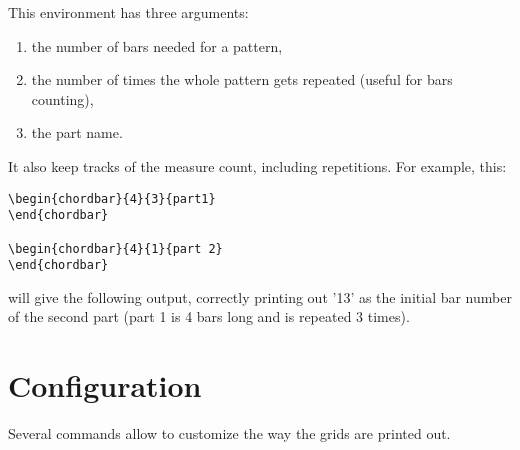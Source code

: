 \documentclass[11pt]{article}
\begin{document}
This environment has three arguments:
\begin{enumerate}
\item the number of bars needed for a pattern,
\item the number of times the whole pattern gets repeated (useful for bars counting),
\item the part name.
\end{enumerate}

It also keep tracks of the measure count, including repetitions. For example, this:

\begin{lstlisting}
\begin{chordbar}{4}{3}{part1}
\end{chordbar}

\begin{chordbar}{4}{1}{part 2}
\end{chordbar}
\end{lstlisting}

will give the following output, correctly printing out '13' as the initial bar number of the second part (part 1 is 4 bars long and is repeated 3 times).

\resetchordbars
\begin{chordbar}{4}{3}{}
\end{chordbar}
\begin{chordbar}{4}{1}{}
\end{chordbar}

\section{Configuration}

Several commands allow to customize the way the grids are printed out.
\end{document}
